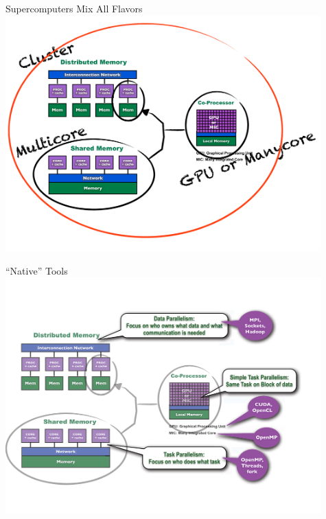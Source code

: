 \begin{frame}
\begin{block}{Supercomputers Mix All Flavors}
    \includegraphics[width=0.91\textwidth]{pics/ParallelHardware5.pdf}
\end{block}
\end{frame}

\begin{frame}
\begin{block}{``Native'' Tools}
    \includegraphics[width=0.91\textwidth]{pics/ParallelHardware6.pdf}
\end{block}
\end{frame}

